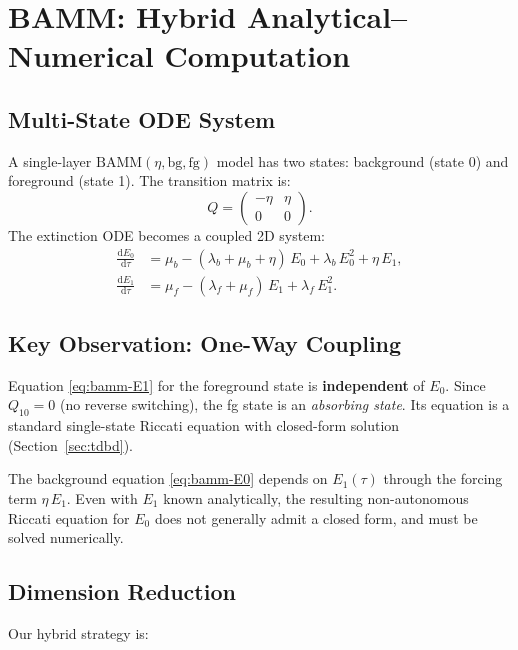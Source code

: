 \documentclass[11pt,a4paper]{article}
\newcommand{\dd}{\mathrm{d}}
\theoremstyle{plain}
\theoremstyle{definition}
\theoremstyle{remark}
\begin{document}
\section{BAMM: Hybrid Analytical--Numerical Computation}
\label{sec:bamm}

\subsection{Multi-State ODE System}

A single-layer $\text{BAMM}(\eta, \text{bg}, \text{fg})$ model has two states: background (state 0) and foreground (state 1).
The transition matrix is:
\[
  Q = \begin{pmatrix} -\eta & \eta \\ 0 & 0 \end{pmatrix}.
\]
The extinction ODE becomes a coupled 2D system:
\begin{align}
  \frac{\dd E_0}{\dd\tau} &= \mu_b - (\lambda_b + \mu_b + \eta)\,E_0 + \lambda_b\,E_0^2 + \eta\,E_1, \label{eq:bamm-E0}\\
  \frac{\dd E_1}{\dd\tau} &= \mu_f - (\lambda_f + \mu_f)\,E_1 + \lambda_f\,E_1^2. \label{eq:bamm-E1}
\end{align}

\subsection{Key Observation: One-Way Coupling}

Equation \eqref{eq:bamm-E1} for the foreground state is \textbf{independent} of $E_0$.
Since $Q_{10} = 0$ (no reverse switching), the fg state is an \emph{absorbing state}.
Its equation is a standard single-state Riccati equation with closed-form solution (Section~\ref{sec:tdbd}).

The background equation \eqref{eq:bamm-E0} depends on $E_1(\tau)$ through the forcing term $\eta\,E_1$.
Even with $E_1$ known analytically, the resulting non-autonomous Riccati equation for $E_0$ does not generally admit a closed form, and must be solved numerically.

\subsection{Dimension Reduction}

Our hybrid strategy is:
\end{document}
